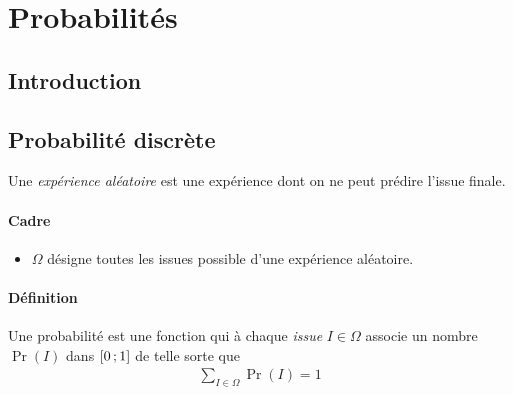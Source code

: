 \documentclass[main.tex]{subfiles}
\begin{document}
\chapter{Probabilités}

\section{Introduction}

\section{Probabilité discrète}

\begin{definition}

    Une \emph{expérience aléatoire} est une expérience
    dont on ne peut prédire l'issue finale.
\end{definition}

\begin{definition}

    \subsubsection{Cadre}
    \begin{itemize}
        \item $\Omega$ désigne toutes les issues possible d'une expérience aléatoire.
    \end{itemize}

    \subsubsection{Définition}
    Une probabilité est une fonction qui à chaque \emph{issue} $I \in \Omega$
    associe un nombre $\Pr(I)$ dans $\mathopen{[}0\,;1\mathclose{]}$ de telle sorte que
    \begin{align}
        \sum_{I \in \Omega} \Pr(I) = 1
    \end{align}
\end{definition}
\end{document}
